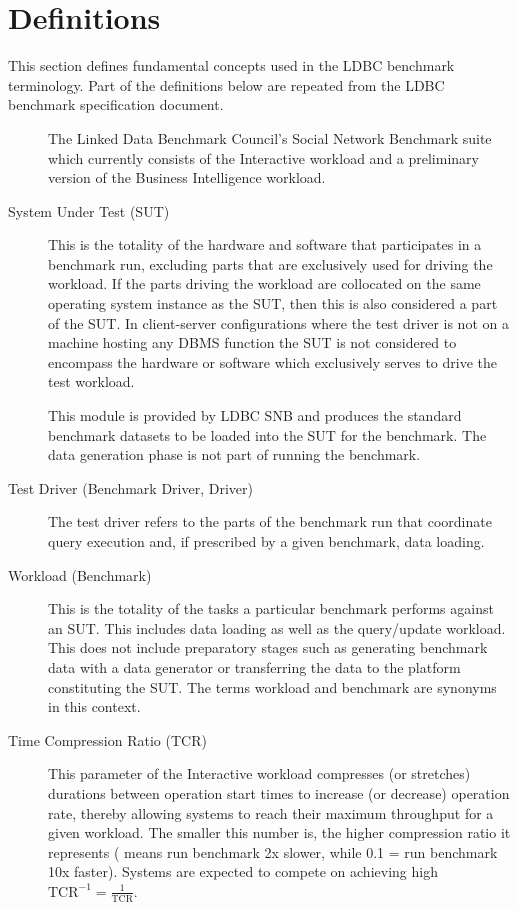 \chapter*{Definitions}

This section defines fundamental concepts used in the LDBC benchmark terminology. Part of the definitions below are repeated from the LDBC benchmark specification document.

\begin{description}
    \item[\ldbcsnb] The Linked Data Benchmark Council's Social Network Benchmark suite which currently consists of the Interactive workload and a preliminary version of the Business Intelligence workload.
    
    \item[System Under Test (SUT)] This is the totality of the hardware and software that participates in a benchmark run, excluding parts that are exclusively used for driving the workload. If the parts driving the workload are collocated on the same operating system instance as the SUT, then this is also considered a part of the SUT. In client-server configurations where the test driver is not on a machine hosting any DBMS function the SUT is not considered to encompass the hardware or software which exclusively serves to drive the test workload.
    
    \item[\datagen] This module is provided by LDBC SNB and produces the standard benchmark datasets to be loaded into the SUT for the benchmark. The data generation phase is not part of running the benchmark.
 
    \item[Test Driver (Benchmark Driver, Driver)] The test driver refers to the parts of the benchmark run that coordinate query execution and, if prescribed by a given benchmark, data loading.
    
    \item[Workload (Benchmark)] This is the totality of the tasks a particular benchmark performs against an SUT. This includes data loading as well as the query/update workload. This does not include preparatory stages such as generating benchmark data with a data generator or transferring the data to the platform constituting the SUT. 
    The terms workload and benchmark are synonyms in this context. 

    \item[Time Compression Ratio (TCR)]
    This parameter of the Interactive workload compresses (or stretches) durations between operation start times to increase (or decrease) operation rate, thereby allowing systems to reach their maximum throughput for a given workload. The smaller this number is, the higher compression ratio it represents ( means run benchmark 2x slower, while 0.1 = run benchmark 10x faster). Systems are expected to compete on achieving high $\text{TCR}^{-1}=\frac{1}{\text{TCR}}$.
    

\end{description}
